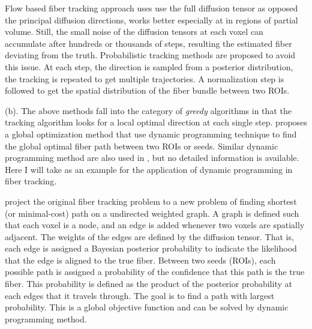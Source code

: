 \documentclass[12pt]{article}
\begin{document}
Flow based fiber tracking approach \citep{campbell2005flow} uses use the full
diffusion tensor as opposed the principal diffusion directions, works better
especially at in regions of partial volume. Still, the small noise of the
diffusion tensors at each voxel can accumulate after hundreds or thousands of
steps, resulting the estimated fiber deviating from the truth. Probabilistic
tracking methods \citep{basser2000vivo} are proposed to avoid this issue. At
each step, the direction is sampled from a posterior distribution, the tracking
is repeated to get multiple trajectories. A normalization step is followed to
get the spatial distribution of the fiber bundle between two ROIs.

(b). The above methods fall into the category of \emph{greedy} algorithms in
that the tracking algorithm looks for a local optimal direction at each single
step. \citet{zalesky2008dt} proposes a global optimization method that use
dynamic programming technique to find the global optimal fiber path between two
ROIs or seeds. Similar dynamic programming method are also used in
\citet{poynton2005probabilistic}, but no detailed information is available. Here
I will take \citeauthor{zalesky2008dt} as an example for the application of
dynamic programming in fiber tracking.

\citeauthor{zalesky2008dt} project the original fiber tracking problem to a new
problem of finding shortest (or minimal-cost) path on a undirected weighted
graph. A graph is defined such that each voxel is a node, and an edge is added
whenever two voxels are spatially adjacent. The weights of the edges are defined
by the diffusion tensor. That is, each edge is assigned a Bayesian posterior
probability to indicate the likelihood that the edge is aligned to the true
fiber. Between two seeds (ROIs), each possible path is assigned a probability of
the confidence that this path is the true fiber. This probability is defined as
the product of the posterior probability at each edges that it travels
through. The goal is to find a path with largest probability. This is a global
objective function and can be solved by dynamic programming method.
\end{document}
